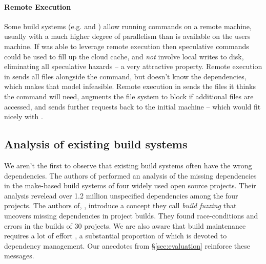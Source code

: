 \paragraph{Remote Execution} Some build systems (e.g. \Bazel and \BuildXL \cite{build}) allow running commands on a remote machine, usually with a much higher degree of parallelism than is available on the users machine. If \Rattle was able to leverage remote execution then speculative commands could be used to fill up the cloud cache, and \emph{not} involve local writes to disk, eliminating all speculative hazards -- a very attractive property. Remote execution in \Bazel sends all files alongside the command, but \Rattle doesn't know the dependencies, which makes that model infeasible. Remote execution in \BuildXL sends the files it thinks the command will need, augments the file system to block if additional files are accessed, and sends further requests back to the initial machine -- which would fit nicely with \Rattle.

\subsection{Analysis of existing build systems}

We aren't the first to observe that existing build systems often have the wrong dependencies.  The authors of \cite{bezemer2017empiricla} performed an analysis of the missing dependencies in the make-based build systems of four widely used open source projects.  Their analysis revelead over 1.2 million unspecified dependencies among the four projects.  The authors of, \cite{detecting_incorrect_build_rules}, introduce a concept they call \emph{build fuzzing} that uncovers missing dependencies in project builds.  They found race-conditions and errors in the builds of 30 projects. We are also aware that build maintenance requires a lot of effort \cite{build_maintenance}, a substantial proportion of which is devoted to dependency management. Our anecdotes from \S\ref{sec:evaluation} reinforce these messages.

\begin{comment}
\subsection{Other related work}

The notion of hazards is used extensively in processor design. This is standard terminology.
\end{comment}
